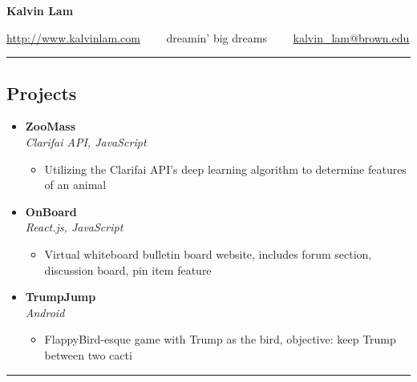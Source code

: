 \documentclass[10pt,letterpaper]{article}
\begin{document}
\begin{center}
{\huge \textbf{Kalvin Lam}}


\href{http://www.kalvinlam.com}{http://www.kalvinlam.com}\ \ \textbullet
\ \ dreamin' big dreams\ \ \textbullet
\ \ \href{malto:kalvin_lam@brown.edu}{kalvin\_lam@brown.edu}

\end{center}

\hrule
\vspace{-1.0em}
\subsection*{Projects}
  \begin{itemize}
    \parskip=-0.5em
    \item[]
    {\textbf{ZooMass} \hfill
      \textbf{}}
    \\
    {\emph{Clarifai API, JavaScript} \hfill \emph{}}

    \begin{itemize}[label=\textbullet]
      \itemsep0em
      \item Utilizing the Clarifai API's deep learning algorithm to determine features of an animal
    \end{itemize}
     \item[]
    {\textbf{OnBoard} \hfill
      \textbf{}}
    \\
    {\emph{React.js, JavaScript} \hfill \emph{}}

    \begin{itemize}[label=\textbullet]
      \itemsep0em
      \item Virtual whiteboard bulletin board website, includes forum section,
discussion board, pin item feature
    \end{itemize}
     \item[]
    {\textbf{TrumpJump} \hfill
      \textbf{}}
    \\
    {\emph{Android} \hfill \emph{}}

    \begin{itemize}[label=\textbullet]
      \itemsep0em
      \item FlappyBird-esque game with Trump as the bird, objective: keep Trump
between two cacti
    \end{itemize}
    
\end{itemize}

\hrule
\vspace{-1.0em}
\end{document}
